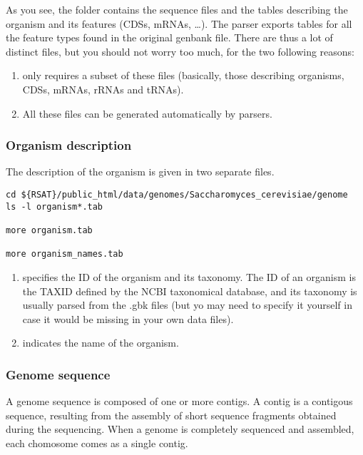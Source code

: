 As you see, the folder  contains the sequence files and
the tables describing the organism and its features (CDSs, mRNAs,
\ldots). The \RSAT parser exports tables for all the feature types
found in the original genbank file. There are thus a lot of distinct
files, but you should not worry too much, for the two following
reasons:
\begin{enumerate}
\item \RSAT only requires a subset of these files (basically, those
  describing organisms, CDSs, mRNAs, rRNAs and tRNAs).
\item All these files can be generated automatically by \RSAT parsers.
\end{enumerate}

\subsubsection{Organism description} 

The description of the organism is given in two separate files.


\begin{footnotesize}
\begin{verbatim}
cd ${RSAT}/public_html/data/genomes/Saccharomyces_cerevisiae/genome
ls -l organism*.tab

more organism.tab

more organism_names.tab
\end{verbatim}
\end{footnotesize}

\begin{enumerate}
\item {} specifies the ID of the organism and its
  taxonomy. The ID of an organism is the TAXID defined by the NCBI
  taxonomical database, and its taxonomy is usually parsed from the
  .gbk files (but yo may need to specify it yourself in case it would
  be missing in your own data files).

\item {} indicates the name of the organism.
\end{enumerate}


\subsubsection{Genome sequence} 

A genome sequence is composed of one or more contigs. A contig is a
contigous sequence, resulting from the assembly of short sequence
fragments obtained during the sequencing. When a genome is completely
sequenced and assembled, each chomosome comes as a single contig. 

